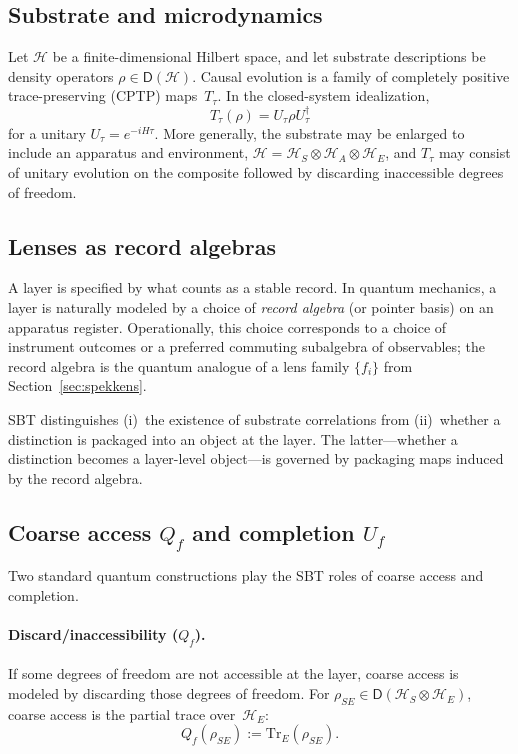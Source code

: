 \documentclass[11pt]{article}
\begin{document}
\subsection{Substrate and microdynamics}

Let $\mathcal{H}$ be a finite-dimensional Hilbert space, and let substrate descriptions be density operators
$\rho \in \mathsf{D}(\mathcal{H})$.\cite{NielsenChuang2010QCQI}
Causal evolution is a family of completely positive trace-preserving (CPTP) maps~$T_\tau$.\cite{NielsenChuang2010QCQI}
In the closed-system idealization,
\[
T_\tau(\rho)=U_\tau \rho U_\tau^\dagger
\]
for a unitary $U_\tau = e^{-iH\tau}$.
More generally, the substrate may be enlarged to include an apparatus and environment,
$\mathcal{H}=\mathcal{H}_S\otimes \mathcal{H}_A\otimes \mathcal{H}_E$,
and $T_\tau$ may consist of unitary evolution on the composite followed by discarding inaccessible degrees of freedom.

\subsection{Lenses as record algebras}

A layer is specified by what counts as a stable record.
In quantum mechanics, a layer is naturally modeled by a choice of \emph{record algebra} (or pointer basis) on an apparatus register.\cite{Zurek2003Decoherence}
Operationally, this choice corresponds to a choice of instrument outcomes or a preferred commuting subalgebra of observables;
the record algebra is the quantum analogue of a lens family $\{f_i\}$ from Section~\ref{sec:spekkens}.

SBT distinguishes (i)~the existence of substrate correlations from (ii)~whether a distinction is packaged into an object at the layer.
The latter---whether a distinction becomes a layer-level object---is governed by packaging maps induced by the record algebra.

\subsection{Coarse access $Q_f$ and completion $U_f$}

Two standard quantum constructions play the SBT roles of coarse access and completion.

\paragraph{Discard/inaccessibility ($Q_f$).}
If some degrees of freedom are not accessible at the layer, coarse access is modeled by discarding those degrees of freedom.
For $\rho_{SE}\in \mathsf{D}(\mathcal{H}_S\otimes \mathcal{H}_E)$, coarse access is the partial trace over~$\mathcal{H}_E$:
\[
Q_f(\rho_{SE}) := \mathrm{Tr}_E(\rho_{SE}).
\]
\end{document}
